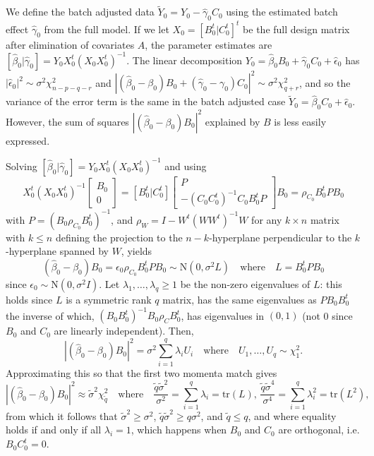 \documentclass{bio}
\begin{document}
We define the batch adjusted data $\tilde Y_0=Y_0-\hat\gamma_0C_0$ using the estimated batch effect $\hat\gamma_0$ from the full model. If we let $X_0=[B_0^t| C_0^t]^t$ be the full design matrix after elimination of covariates $A$, the parameter estimates are $[\hat\beta_0|\hat\gamma_0]=Y_0X_0^t(X_0X_0^t)^{-1}$. The linear decomposition $Y_0=\hat\beta_0B_0+\hat\gamma_0C_0+\hat\epsilon_0$ has $|\hat\epsilon_0|^2\sim\sigma^2\chi^2_{n-p-q-r}$ and
$|(\hat\beta_0-\beta_0)B_0+(\hat\gamma_0-\gamma_0)C_0|^2\sim\sigma^2\chi^2_{q+r}$, and so the variance of the error term is the same in the batch adjusted case $\tilde Y_0=\hat\beta_0C_0+\hat\epsilon_0$. However, the sum of squares $|(\hat\beta_0-\beta_0)B_0|^2$ explained by $B$ is less easily expressed.

Solving $[\hat\beta_0|\hat\gamma_0]=Y_0X_0^t(X_0X_0^t)^{-1}$ and using
\begin{equation}
X_0^t(X_0X_0^t)^{-1} \begin{bmatrix}B_0\\0\end{bmatrix}
=[B_0^t|C_0^t] \begin{bmatrix}P\\-(C_0C_0^t)^{-1}C_0B_0^tP\end{bmatrix} B_0
=\rho_{C_0}B_0^tPB_0
\end{equation}
with $P=(B_0\rho_{C_0}B_0^t)^{-1}$, and $\rho_{W}=I-W^t(WW^t)^{-1}W$ for any $k\times n$ matrix with $k\le n$ defining the projection to the $n-k$-hyperplane perpendicular to the $k$-hyperplane spanned by $W$, yields
\begin{equation}
(\hat\beta_0-\beta_0)B_0=\epsilon_0\rho_{C_0}B_0^tPB_0\sim\text{N}(0,\sigma^2L)
\quad\text{where}\quad
L=B_0^tPB_0
\end{equation}
since $\epsilon_0\sim\text{N}(0,\sigma^2I)$. Let $\lambda_1,\ldots,\lambda_q\ge1$ be the non-zero eigenvalues of $L$: this holds since $L$ is a symmetric rank $q$ matrix,  has the same eigenvalues as $PB_0B_0^t$ the inverse of which, $(B_0B_0^t)^{-1}B_0\rho_{C}B_0^t$, has eigenvalues in $(0,1)$ (not 0 since $B_0$ and $C_0$ are linearly independent). Then,
\begin{equation}
|(\hat\beta_0-\beta_0)B_0|^2=\sigma^2\sum_{i=1}^q\lambda_iU_i
\quad\text{where}\quad
U_1,\ldots,U_q\sim\chi^2_1.
\end{equation}
Approximating this so that the first two momenta match gives
\begin{equation}
|(\hat\beta_0-\beta_0)B_0|^2\approx\tilde\sigma^2\chi^2_{\tilde q}
\quad\text{where}\quad
\frac{\tilde q\tilde\sigma^2}{\sigma^2}=\sum_{i=1}^q\lambda_i=\text{tr}(L),\,
\frac{\tilde q\tilde\sigma^4}{\sigma^4}=\sum_{i=1}^q\lambda_i^2=\text{tr}(L^2),
\end{equation}
from which it follows that $\tilde\sigma^2\ge\sigma^2$, $\tilde q\tilde\sigma^2\ge q\sigma^2$, and $\tilde q\le q$, and where equality holds if and only if all $\lambda_i=1$, which happens when $B_0$ and $C_0$ are orthogonal, i.e. $B_0C_0^t=0$.
\end{document}
